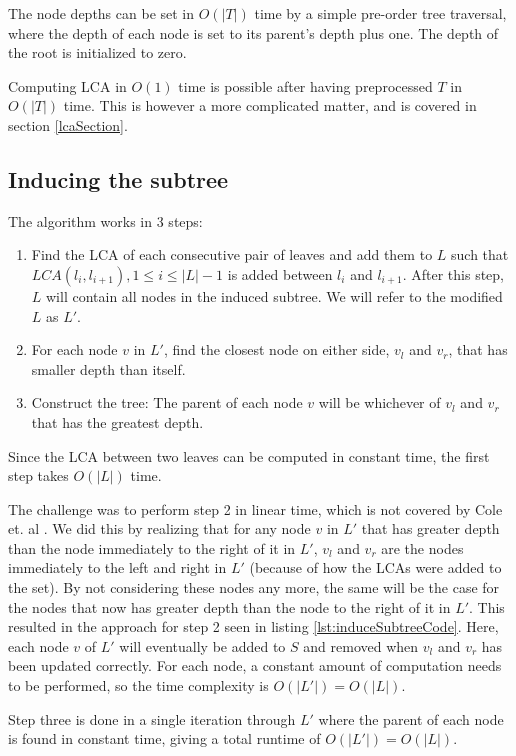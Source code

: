 The node depths can be set in $O(|T|)$ time by a simple pre-order tree traversal, where the depth of each node is set to its parent's depth plus one. The depth of the root is initialized to zero.  

Computing LCA in $O(1)$ time is possible after having preprocessed $T$ in $O(|T|)$ time. This is however a more complicated matter, and is covered in section \ref{lcaSection}.

\subsection{Inducing the subtree}
The algorithm works in 3 steps:
\begin{enumerate}
	\item Find the LCA of each consecutive pair of leaves and add them to $L$ such that $LCA(l_i,l_{i+1}), 1 \le i \le |L|-1$ is added between $l_i$ and $l_{i+1}$.
	\subitem After this step, $L$ will contain all nodes in the induced subtree.
	\subitem We will refer to the modified $L$ as $L'$.
	\item For each node $v$ in $L'$, find the closest node on either side, $v_l$ and $v_r$, that has smaller depth than itself.
	\item Construct the tree: The parent of each node $v$ will be whichever of $v_l$ and $v_r$ that has the greatest depth.
\end{enumerate}

Since the LCA between two leaves can be computed in constant time, the first step takes $O(|L|)$ time.

The challenge was to perform step 2 in linear time, which is not covered by Cole et. al \cite{nlogn}. We did this by realizing that for any node $v$ in $L'$ that has greater depth than the node immediately to the right of it in $L'$, $v_l$ and $v_r$ are the nodes immediately to the left and right in $L'$ (because of how the LCAs were added to the set). By not considering these nodes any more, the same will be the case for the nodes that now has greater depth than the node to the right of it in $L'$. This resulted in the approach for step 2 seen in listing \ref{lst:induceSubtreeCode}. Here, each node $v$ of $L'$ will eventually be added to $S$ and removed when $v_l$ and $v_r$ has been updated correctly. For each node, a constant amount of computation needs to be performed, so the time complexity is $O(|L'|) = O(|L|)$.

Step three is done in a single iteration through $L'$ where the parent of each node is found in constant time, giving a total runtime of $O(|L'|) = O(|L|)$.


